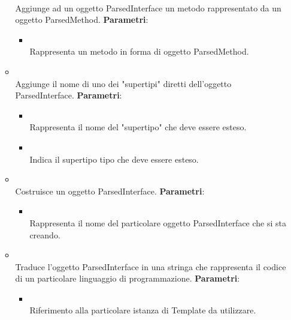\begin{itemize}
\begin{itemize}
\\ Aggiunge ad un oggetto ParsedInterface un metodo rappresentato da un oggetto ParsedMethod.
\textbf{Parametri}:
\begin{itemize}
\item {}
\\ Rappresenta un metodo in forma di oggetto ParsedMethod.
\end{itemize}
\item {}
\\ Aggiunge il nome di uno dei "supertipi" diretti dell'oggetto ParsedInterface.
\textbf{Parametri}:
\begin{itemize}
\item {}
\\ Rappresenta il nome del "supertipo" che deve essere esteso.
\item {}
\\ Indica il supertipo tipo che deve essere esteso.
\end{itemize}
\item {}
\\ Costruisce un oggetto ParsedInterface.
\textbf{Parametri}:
\begin{itemize}
\item {}
\\ Rappresenta il nome del particolare oggetto ParsedInterface che si sta creando.
\end{itemize}
\item {}
\\ Traduce l'oggetto ParsedInterface in una stringa che rappresenta il codice di un particolare linguaggio di programmazione.
\textbf{Parametri}:
\begin{itemize}
\item {}
\\ Riferimento alla particolare istanza di Template da utilizzare.
\end{itemize}
\end{itemize}
\end{itemize}

